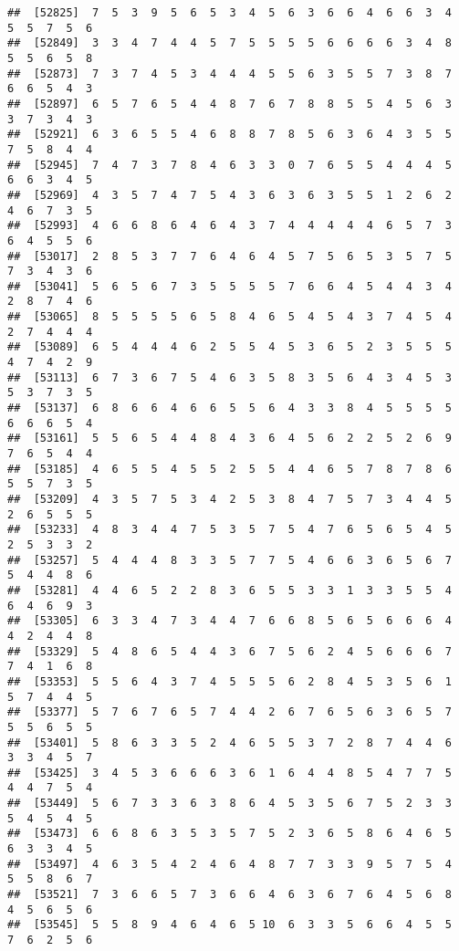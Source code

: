 \documentclass[
]{book}
\begin{document}
\begin{verbatim}
##  [52825]  7  5  3  9  5  6  5  3  4  5  6  3  6  6  4  6  6  3  4  5  5  7  5  6
##  [52849]  3  3  4  7  4  4  5  7  5  5  5  5  6  6  6  6  3  4  8  5  5  6  5  8
##  [52873]  7  3  7  4  5  3  4  4  4  5  5  6  3  5  5  7  3  8  7  6  6  5  4  3
##  [52897]  6  5  7  6  5  4  4  8  7  6  7  8  8  5  5  4  5  6  3  3  7  3  4  3
##  [52921]  6  3  6  5  5  4  6  8  8  7  8  5  6  3  6  4  3  5  5  7  5  8  4  4
##  [52945]  7  4  7  3  7  8  4  6  3  3  0  7  6  5  5  4  4  4  5  6  6  3  4  5
##  [52969]  4  3  5  7  4  7  5  4  3  6  3  6  3  5  5  1  2  6  2  4  6  7  3  5
##  [52993]  4  6  6  8  6  4  6  4  3  7  4  4  4  4  4  6  5  7  3  6  4  5  5  6
##  [53017]  2  8  5  3  7  7  6  4  6  4  5  7  5  6  5  3  5  7  5  7  3  4  3  6
##  [53041]  5  6  5  6  7  3  5  5  5  5  7  6  6  4  5  4  4  3  4  2  8  7  4  6
##  [53065]  8  5  5  5  5  6  5  8  4  6  5  4  5  4  3  7  4  5  4  2  7  4  4  4
##  [53089]  6  5  4  4  4  6  2  5  5  4  5  3  6  5  2  3  5  5  5  4  7  4  2  9
##  [53113]  6  7  3  6  7  5  4  6  3  5  8  3  5  6  4  3  4  5  3  5  3  7  3  5
##  [53137]  6  8  6  6  4  6  6  5  5  6  4  3  3  8  4  5  5  5  5  6  6  6  5  4
##  [53161]  5  5  6  5  4  4  8  4  3  6  4  5  6  2  2  5  2  6  9  7  6  5  4  4
##  [53185]  4  6  5  5  4  5  5  2  5  5  4  4  6  5  7  8  7  8  6  5  5  7  3  5
##  [53209]  4  3  5  7  5  3  4  2  5  3  8  4  7  5  7  3  4  4  5  2  6  5  5  5
##  [53233]  4  8  3  4  4  7  5  3  5  7  5  4  7  6  5  6  5  4  5  2  5  3  3  2
##  [53257]  5  4  4  4  8  3  3  5  7  7  5  4  6  6  3  6  5  6  7  5  4  4  8  6
##  [53281]  4  4  6  5  2  2  8  3  6  5  5  3  3  1  3  3  5  5  4  6  4  6  9  3
##  [53305]  6  3  3  4  7  3  4  4  7  6  6  8  5  6  5  6  6  6  4  4  2  4  4  8
##  [53329]  5  4  8  6  5  4  4  3  6  7  5  6  2  4  5  6  6  6  7  7  4  1  6  8
##  [53353]  5  5  6  4  3  7  4  5  5  5  6  2  8  4  5  3  5  6  1  5  7  4  4  5
##  [53377]  5  7  6  7  6  5  7  4  4  2  6  7  6  5  6  3  6  5  7  5  5  6  5  5
##  [53401]  5  8  6  3  3  5  2  4  6  5  5  3  7  2  8  7  4  4  6  3  3  4  5  7
##  [53425]  3  4  5  3  6  6  6  3  6  1  6  4  4  8  5  4  7  7  5  4  4  7  5  4
##  [53449]  5  6  7  3  3  6  3  8  6  4  5  3  5  6  7  5  2  3  3  5  4  5  4  5
##  [53473]  6  6  8  6  3  5  3  5  7  5  2  3  6  5  8  6  4  6  5  6  3  3  4  5
##  [53497]  4  6  3  5  4  2  4  6  4  8  7  7  3  3  9  5  7  5  4  5  5  8  6  7
##  [53521]  7  3  6  6  5  7  3  6  6  4  6  3  6  7  6  4  5  6  8  4  5  6  5  6
##  [53545]  5  5  8  9  4  6  4  6  5 10  6  3  3  5  6  6  4  5  5  7  6  2  5  6

\end{verbatim}
\end{document}
